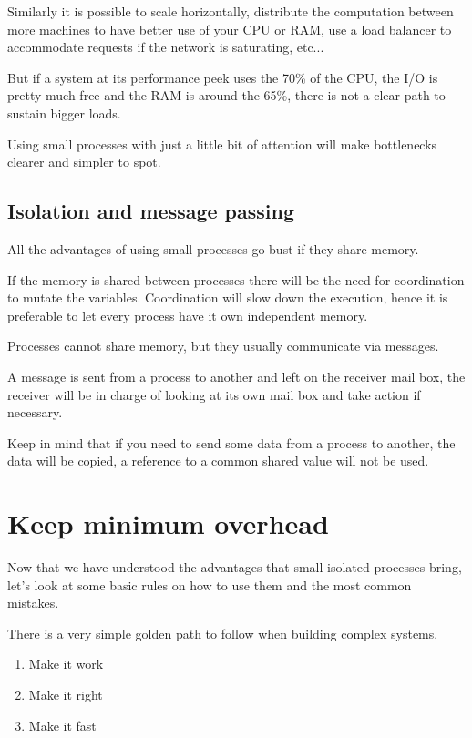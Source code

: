 \documentclass[12pt]{article} %
\begin{document}
Similarly it is possible to scale horizontally, distribute the computation between more machines to have better use of your CPU or RAM, use a load balancer to accommodate requests if the network is saturating, etc...

But if a system at its performance peek uses the 70\% of the CPU, the I/O is pretty much free and the RAM is around the 65\%, there is not a clear path to sustain bigger loads.

Using small processes with just a little bit of attention will make bottlenecks clearer and simpler to spot.

	\subsection{Isolation and message passing}
	
All the advantages of using small processes go bust if they share memory.

If the memory is shared between processes there will be the need for coordination to mutate the variables. Coordination will slow down the execution, hence it is preferable to let every process have it own independent memory.

Processes cannot share memory, but they usually communicate via messages.

A message is sent from a process to another and left on the receiver mail box, the receiver will be in charge of looking at its own mail box and take action if necessary.

Keep in mind that if you need to send some data from a process to another, the data will be copied, a reference to a common shared value will not be used.

\section{Keep minimum overhead}

Now that we have understood the advantages that small isolated processes bring, let's look at some basic rules on how to use them and the most common mistakes.

There is a very simple golden path to follow when building complex systems.

\begin{enumerate}
	\item Make it work
	\item Make it right
	\item Make it fast
\end{enumerate}
\end{document}
